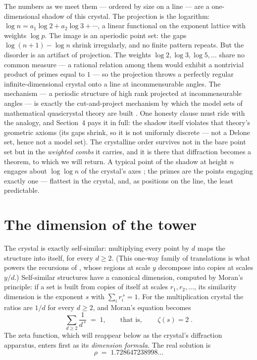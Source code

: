 \documentclass[11pt]{article}
\theoremstyle{remark}
\begin{document}
The numbers as we meet them --- ordered by size on a line --- are a one-dimensional shadow of this
crystal. The projection is the logarithm: $\log n = a_1 \log 2 + a_2 \log 3 + \cdots$, a linear
functional on the exponent lattice with weights $\log p$. The image is an aperiodic point set: the
gaps $\log(n{+}1) - \log n$ shrink irregularly, and no finite pattern repeats. But the disorder is an
artifact of projection. The weights $\log 2, \log 3, \log 5, \ldots$ share no common measure --- a
rational relation among them would exhibit a nontrivial product of primes equal to $1$ --- so the
projection throws a perfectly regular infinite-dimensional crystal onto a line at incommensurable
angles. The mechanism --- a periodic structure of high rank projected at incommensurable angles ---
is exactly the cut-and-project mechanism by which the model sets of mathematical quasicrystal
theory are built \cite{BaakeGrimm}. One honesty clause must ride with the analogy, and Section~4
pays it in full: the shadow itself violates that theory's geometric axioms (its gaps shrink, so it
is not uniformly discrete --- not a Delone set, hence not a model set). The crystalline order
survives not in the bare point set but in the \emph{weighted combs} it carries, and it is there
that diffraction becomes a theorem, to which we will return. A
typical point of the shadow at height $n$ engages about $\log\log n$ of the crystal's axes
\cite{HardyRamanujan}; the primes are the points engaging exactly one --- flattest in the crystal,
and, as positions on the line, the least predictable.

\section{The dimension of the tower}

The crystal is exactly self-similar: multiplying every point by $d$ maps the structure into itself,
for every $d \ge 2$. (This one-way family of translations is what powers the recursions of
\cite{CompanionI}, whose regions at scale $y$ decompose into copies at scales $y/d$.) Self-similar
structures have a canonical dimension, computed by Moran's principle: if a set is built from copies
of itself at scales $r_1, r_2, \ldots$, its similarity dimension is the exponent $s$ with
$\sum_i r_i^{\,s} = 1$. For the multiplication crystal the ratios are $1/d$ for every $d \ge 2$, and
Moran's equation becomes
\[
\sum_{d \ge 2} \frac{1}{d^{\,s}} \;=\; 1, \qquad\text{that is,}\qquad \boxed{\;\zeta(s) = 2\;.}
\]
The zeta function, which will reappear below as the crystal's diffraction apparatus, enters first as
its \emph{dimension formula}. The real solution is
\[
\rho \;=\; 1.728647238998\ldots
\]
\end{document}
